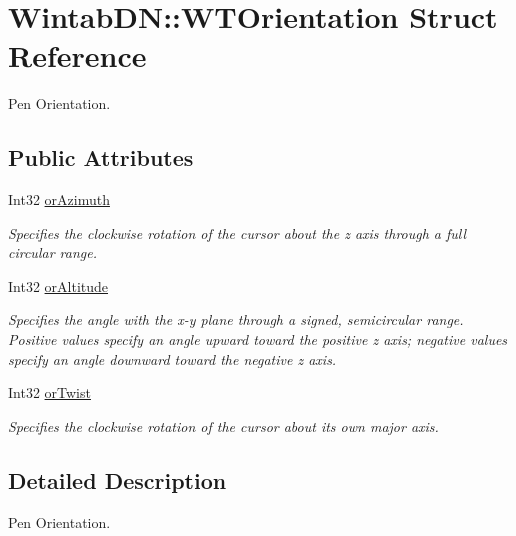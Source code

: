 \hypertarget{struct_wintab_d_n_1_1_w_t_orientation}{
\section{WintabDN::WTOrientation Struct Reference}
\label{struct_wintab_d_n_1_1_w_t_orientation}
}


Pen Orientation.  


\subsection*{Public Attributes}
\begin{DoxyCompactItemize}
\item 
Int32 \hyperlink{struct_wintab_d_n_1_1_w_t_orientation_ae280f0ee6efa5399950862eb02710cb2}{orAzimuth}
\begin{DoxyCompactList}\small\item\em Specifies the clockwise rotation of the cursor about the z axis through a full circular range. \item\end{DoxyCompactList}\item 
Int32 \hyperlink{struct_wintab_d_n_1_1_w_t_orientation_a94182c4f6543a31161e16b2a684b954f}{orAltitude}
\begin{DoxyCompactList}\small\item\em Specifies the angle with the x-\/y plane through a signed, semicircular range. Positive values specify an angle upward toward the positive z axis; negative values specify an angle downward toward the negative z axis. \item\end{DoxyCompactList}\item 
Int32 \hyperlink{struct_wintab_d_n_1_1_w_t_orientation_a685f37c134a39e615770809ab6706555}{orTwist}
\begin{DoxyCompactList}\small\item\em Specifies the clockwise rotation of the cursor about its own major axis. \item\end{DoxyCompactList}\end{DoxyCompactItemize}


\subsection{Detailed Description}
Pen Orientation. 


